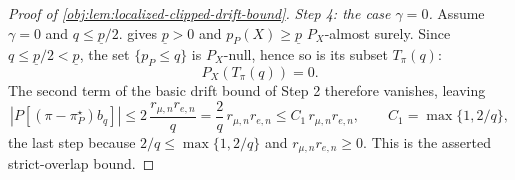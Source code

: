 \documentclass[11pt]{article}
\begin{document}
\begin{proof}[Proof of \cref{obj:lem:localized-clipped-drift-bound}]
\emph{Step 4: the case \(\gamma=0\).}  Assume \(\gamma=0\) and \(q\le\underline p/2\).   gives \(\underline p>0\) and \(p_P(X)\ge\underline p\) \(P_X\)-almost surely.  Since \(q\le\underline p/2<\underline p\), the set \(\{p_P\le q\}\) is \(P_X\)-null, hence so is its subset \(T_\pi(q)\):
\[
P_X\!\left(T_\pi(q)\right)=0 .
\]
The second term of the basic drift bound of Step 2 therefore vanishes, leaving
\[
\left|P\!\left[(\pi-\pi^\star_P)b_q\right]\right|
\le
2\,\frac{r_{\mu,n}r_{e,n}}{q}
=
\frac2q\,r_{\mu,n}r_{e,n}
\le
C_1\,r_{\mu,n}r_{e,n},
\qquad
C_1=\max\{1,2/q\},
\]
the last step because \(2/q\le\max\{1,2/q\}\) and \(r_{\mu,n}r_{e,n}\ge0\).  This is the asserted strict-overlap bound. %
\end{proof}




\end{document}
